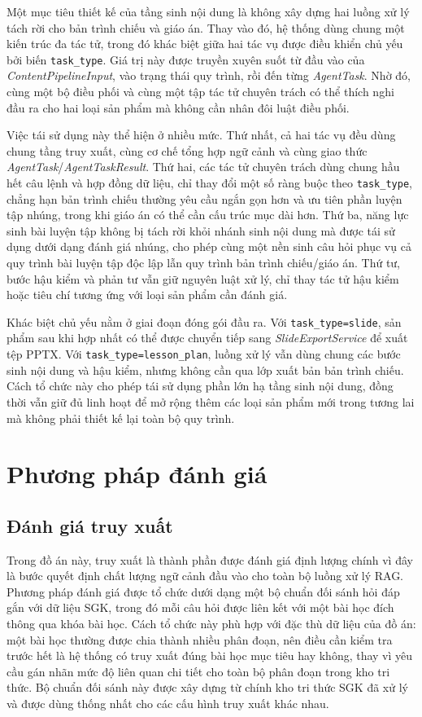 \documentclass[../DoAn.tex]{subfiles}
\begin{document}
Một mục tiêu thiết kế của tầng sinh nội dung là không xây dựng hai luồng xử lý tách rời cho bản trình chiếu và giáo án. Thay vào đó, hệ thống dùng chung một kiến trúc đa tác tử, trong đó khác biệt giữa hai tác vụ được điều khiển chủ yếu bởi biến \texttt{task\_type}. Giá trị này được truyền xuyên suốt từ đầu vào của \textit{ContentPipelineInput}, vào trạng thái quy trình, rồi đến từng \textit{AgentTask}. Nhờ đó, cùng một bộ điều phối và cùng một tập tác tử chuyên trách có thể thích nghi đầu ra cho hai loại sản phẩm mà không cần nhân đôi luật điều phối.

Việc tái sử dụng này thể hiện ở nhiều mức. Thứ nhất, cả hai tác vụ đều dùng chung tầng truy xuất, cùng cơ chế tổng hợp ngữ cảnh và cùng giao thức \textit{AgentTask}/\textit{AgentTaskResult}. Thứ hai, các tác tử chuyên trách dùng chung hầu hết câu lệnh và hợp đồng dữ liệu, chỉ thay đổi một số ràng buộc theo \texttt{task\_type}, chẳng hạn bản trình chiếu thường yêu cầu ngắn gọn hơn và ưu tiên phần luyện tập nhúng, trong khi giáo án có thể cần cấu trúc mục dài hơn. Thứ ba, năng lực sinh bài luyện tập không bị tách rời khỏi nhánh sinh nội dung mà được tái sử dụng dưới dạng đánh giá nhúng, cho phép cùng một nền sinh câu hỏi phục vụ cả quy trình bài luyện tập độc lập lẫn quy trình bản trình chiếu/giáo án. Thứ tư, bước hậu kiểm và phản tư vẫn giữ nguyên luật xử lý, chỉ thay tác tử hậu kiểm hoặc tiêu chí tương ứng với loại sản phẩm cần đánh giá.

Khác biệt chủ yếu nằm ở giai đoạn đóng gói đầu ra. Với \texttt{task\_type=slide}, sản phẩm sau khi hợp nhất có thể được chuyển tiếp sang \textit{SlideExportService} để xuất tệp PPTX. Với \texttt{task\_type=lesson\_plan}, luồng xử lý vẫn dùng chung các bước sinh nội dung và hậu kiểm, nhưng không cần qua lớp xuất bản bản trình chiếu. Cách tổ chức này cho phép tái sử dụng phần lớn hạ tầng sinh nội dung, đồng thời vẫn giữ đủ linh hoạt để mở rộng thêm các loại sản phẩm mới trong tương lai mà không phải thiết kế lại toàn bộ quy trình.

\section{Phương pháp đánh giá}

\subsection{Đánh giá truy xuất}

Trong đồ án này, truy xuất là thành phần được đánh giá định lượng chính vì đây là bước quyết định chất lượng ngữ cảnh đầu vào cho toàn bộ luồng xử lý RAG. Phương pháp đánh giá được tổ chức dưới dạng một bộ chuẩn đối sánh hỏi đáp gắn với dữ liệu SGK, trong đó mỗi câu hỏi được liên kết với một bài học đích thông qua khóa bài học. Cách tổ chức này phù hợp với đặc thù dữ liệu của đồ án: một bài học thường được chia thành nhiều phân đoạn, nên điều cần kiểm tra trước hết là hệ thống có truy xuất đúng bài học mục tiêu hay không, thay vì yêu cầu gán nhãn mức độ liên quan chi tiết cho toàn bộ phân đoạn trong kho tri thức. Bộ chuẩn đối sánh này được xây dựng từ chính kho tri thức SGK đã xử lý và được dùng thống nhất cho các cấu hình truy xuất khác nhau.
\end{document}
